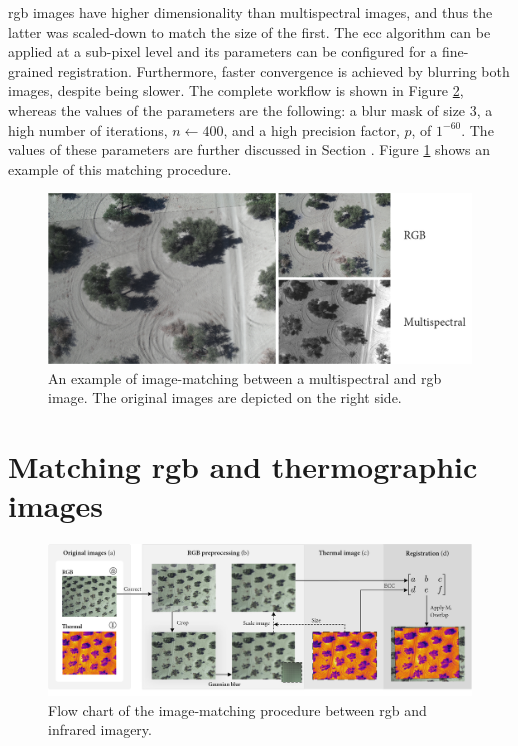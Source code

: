 \acrshort{rgb} images have higher dimensionality than multispectral images, and thus the latter was scaled-down to match the size of the first. The \acrshort{ecc} algorithm can be applied at a sub-pixel level and its parameters can be configured for a fine-grained registration. Furthermore, faster convergence is achieved by blurring both images, despite being slower. The complete workflow is shown in Figure \ref{fig:thermal_registration}, whereas the values of the parameters are the following: a blur mask of size 3, a high number of iterations, $n \gets 400$, and a high precision factor, $p$, of $1^{-60}$. The values of these parameters are further discussed in Section . Figure \ref{fig:rgb_multi_registration_result} shows an example of this matching procedure.

\begin{figure}[ht]
    \centering
    \includegraphics{figs/image_fusion/rgb_multispectral_registration_result.png}
    \caption{An example of image-matching between a multispectral and \acrshort{rgb} image. The original images are depicted on the right side.}
    \label{fig:rgb_multi_registration_result}
\end{figure}

\section{Matching \acrshort{rgb} and thermographic images}

\begin{figure}
    \includegraphics{figs/image_fusion/thermal_registration.png}
    \caption{Flow chart of the image-matching procedure between \acrshort{rgb} and infrared imagery.}
    \label{fig:thermal_registration}
\end{figure}

